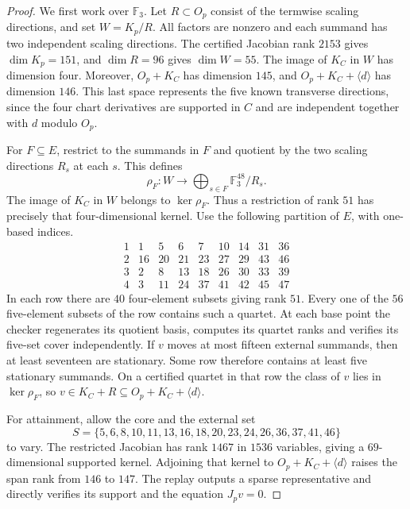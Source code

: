 \documentclass[11pt,reqno]{amsart}
\newcommand{\F}{\mathbb F}
\begin{document}
\begin{proof}
We first work over \(\F_3\). Let \(R\subset O_p\) consist of the termwise scaling directions, and set \(W=K_p/R\). All factors are nonzero and each summand has two independent scaling directions. The certified Jacobian rank \(2153\) gives \(\dim K_p=151\), and \(\dim R=96\) gives \(\dim W=55\). The image of \(K_C\) in \(W\) has dimension four. Moreover, \(O_p+K_C\) has dimension \(145\), and \(O_p+K_C+\langle d\rangle\) has dimension \(146\). This last space represents the five known transverse directions, since the four chart derivatives are supported in \(C\) and are independent together with \(d\) modulo \(O_p\).

For \(F\subseteq E\), restrict to the summands in \(F\) and quotient by the two scaling directions \(R_s\) at each \(s\). This defines
\[
 \rho_F:W\longrightarrow\bigoplus_{s\in F}\F_3^{48}/R_s.
\]
The image of \(K_C\) in \(W\) belongs to \(\ker\rho_F\). Thus a restriction of rank \(51\) has precisely that four-dimensional kernel. Use the following partition of \(E\), with one-based indices.
\[
\begin{array}{c|rrrrrrrr}
 1&1&5&6&7&10&14&31&36\\
 2&16&20&21&23&27&29&43&46\\
 3&2&8&13&18&26&30&33&39\\
 4&3&11&24&37&41&42&45&47
\end{array}
\]
In each row there are \(40\) four-element subsets giving rank \(51\). Every one of the \(56\) five-element subsets of the row contains such a quartet. At each base point the checker regenerates its quotient basis, computes its quartet ranks and verifies its five-set cover independently. If \(v\) moves at most fifteen external summands, then at least seventeen are stationary. Some row therefore contains at least five stationary summands. On a certified quartet in that row the class of \(v\) lies in \(\ker\rho_F\), so \(v\in K_C+R\subseteq O_p+K_C+\langle d\rangle\).

For attainment, allow the core and the external set
\[
 S=\{5,6,8,10,11,13,16,18,20,23,24,26,36,37,41,46\}
\]
to vary. The restricted Jacobian has rank \(1467\) in \(1536\) variables, giving a \(69\)-dimensional supported kernel. Adjoining that kernel to \(O_p+K_C+\langle d\rangle\) raises the span rank from \(146\) to \(147\). The replay outputs a sparse representative and directly verifies its support and the equation \(J_pv=0\).


\end{proof}
\end{document}
